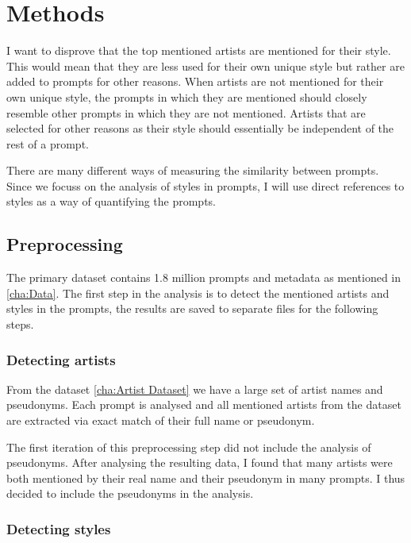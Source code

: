 \chapter{Methods}
\label{cha:Methods}

I want to disprove that the top mentioned artists are mentioned for their style. This would mean that they are less used for their own unique style but rather are added to prompts for other reasons.
When artists are not mentioned for their own unique style, the prompts in which they are mentioned should closely resemble other prompts in which they are not mentioned. Artists that are selected for other reasons as their style should essentially be independent of the rest of a prompt.

There are many different ways of measuring the similarity between prompts. Since we focuss on the analysis of styles in prompts, I will use direct references to styles as a way of quantifying the prompts. 


\section{Preprocessing}

The primary dataset contains 1.8 million prompts and metadata as mentioned in \ref{cha:Data}. The first step in the analysis is to detect the mentioned artists and styles in the prompts, the results are saved to separate files for the following steps.

\subsection{Detecting artists}

From the dataset \ref{cha:Artist Dataset} we have a large set of artist names and pseudonyms. Each prompt is analysed and all mentioned artists from the dataset are extracted via exact match of their full name or pseudonym.

The first iteration of this preprocessing step did not include the analysis of pseudonyms. After analysing the resulting data, I found that many artists were both mentioned by their real name and their pseudonym in many prompts. I thus decided to include the pseudonyms in the analysis.


\subsection{Detecting styles}

